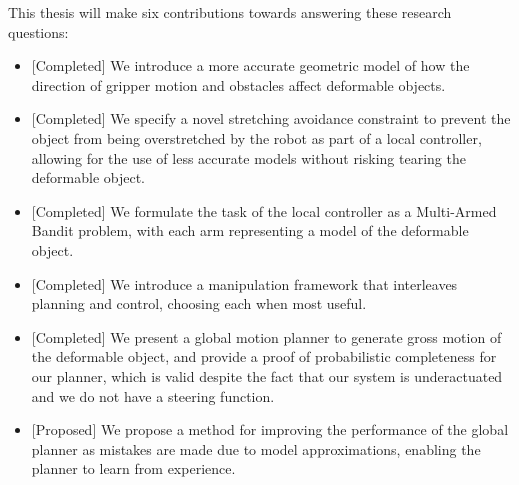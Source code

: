 This thesis will make six contributions towards answering these research questions:
\begin{itemize}
    \item {[Completed]} We introduce a more accurate geometric model of how  the direction of gripper motion and obstacles affect deformable objects.
    \item {[Completed]} We specify a novel stretching avoidance constraint to prevent the object from being overstretched by the robot as part of a local controller, allowing for the use of less accurate models without risking tearing the deformable object.
    \item {[Completed]} We formulate the task of the local controller as a Multi-Armed Bandit problem, with each arm representing a model of the deformable object.
    \item {[Completed]} We introduce a manipulation framework that interleaves planning and control, choosing each when most useful.
    \item {[Completed]} We present a global motion planner to generate gross motion of the deformable object, and provide a proof of probabilistic completeness for our planner, which is valid despite the fact that our system is underactuated and we do not have a steering function.
    \item {[Proposed]} We propose a method for improving the performance of the global planner as mistakes are made due to model approximations, enabling the planner to learn from experience.
\end{itemize}

